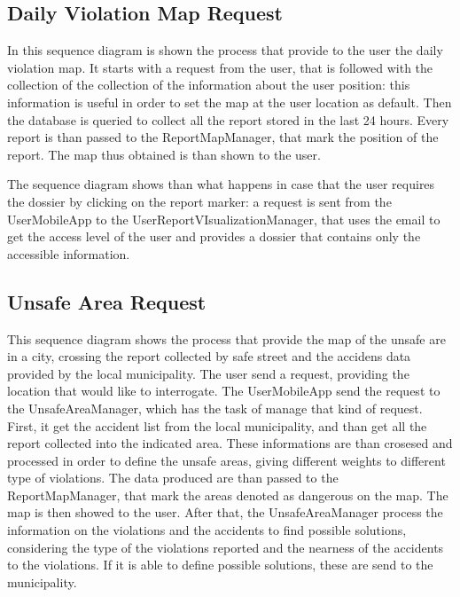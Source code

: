 \documentclass[../RASD.tex]{subfiles}
\begin{document}
    \subsection{Daily Violation Map Request}\label{subsec:daily-violation-map-request}
    \begin{figure}[H]
    \end{figure}
    In this sequence diagram is shown the process that provide to the user the daily violation map. It starts with a request from the user, that is followed with the collection of the collection of the information about the user position: this information is useful in order to set the map at the user location as default. Then the database is queried to collect all the report stored in the last 24 hours. Every report is than passed to the ReportMapManager, that mark the position of the report. The map thus obtained is than shown to the user.

    The sequence diagram shows than what happens in case that the user requires the dossier by clicking on the report marker: a request is sent from the UserMobileApp to the UserReportVIsualizationManager, that uses the email to get the access level of the user and provides a dossier that contains only the accessible information.
    \subsection{Unsafe Area Request}\label{subsec:unsafe-area-request}
    \begin{figure}[H]
    \end{figure}
    This sequence diagram shows the process that provide the map of the unsafe are in a city, crossing the report collected by safe street and the accidens data provided by the local municipality. The user send a request, providing the location that would like to interrogate. The UserMobileApp send the request to the UnsafeAreaManager, which has the task of manage that kind of request. First, it get the accident list from the local municipality, and than get all the report collected into the indicated area. These informations are than crosesed and processed in order to define the unsafe areas, giving different weights to different type of violations. The data produced are than passed to the ReportMapManager, that mark the areas denoted as dangerous on the map. The map is then showed to the user. After that, the UnsafeAreaManager process the information on the violations and the accidents to find possible solutions, considering the type of the violations reported and the nearness of the accidents to the violations. If it is able to define possible solutions, these are send to the municipality.
\end{document}
